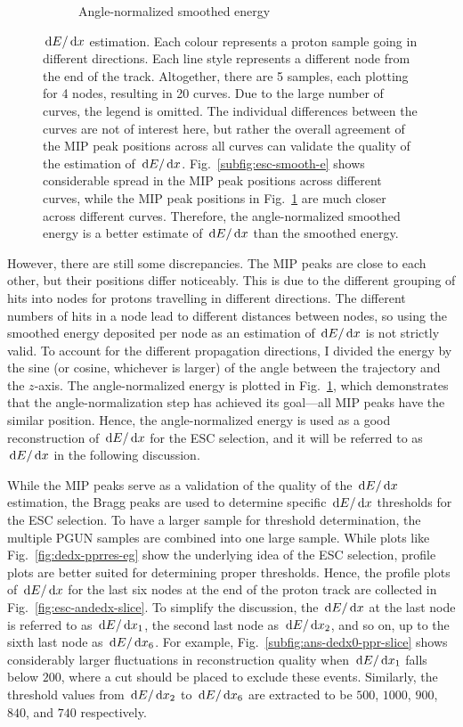 \begin{figure}[htb]
\begin{subfigure}{\dbfigwid\textwidth}
             \caption{Angle-normalized smoothed energy}
             \label{subfig:esc-an-smooth-e}
        \end{subfigure}
        \caption{$\,\textrm{d}E/\,\textrm{d}x$ estimation. Each colour represents a proton sample going in different directions. Each line style represents a different node from the end of the track. Altogether, there are 5 samples, each plotting for 4 nodes, resulting in 20 curves. Due to the large number of curves, the legend is omitted. The individual differences between the curves are not of interest here, but rather the overall agreement of the MIP peak positions across all curves can validate the quality of the estimation of $\,\textrm{d}E/\,\textrm{d}x$. Fig.~\ref{subfig:esc-smooth-e} shows considerable spread in the MIP peak positions across different curves, while the MIP peak positions in Fig.~\ref{subfig:esc-an-smooth-e} are much closer across different curves. Therefore, the angle-normalized smoothed energy is a better estimate of $\,\textrm{d}E/\,\textrm{d}x$ than the smoothed energy.}
        \label{fig:esc-angnorm}
     \end{figure}
     However, there are still some discrepancies.
     The MIP peaks are close to each other, but their positions differ noticeably.
     This is due to the different grouping of hits into nodes for protons travelling in different directions.
     The different numbers of hits in a node lead to different distances between nodes, so using the smoothed energy deposited per node as an estimation of $\,\textrm{d}E/\,\textrm{d}x$ is not strictly valid.
     To account for the different propagation directions, I divided the energy by the sine (or cosine, whichever is larger) of the angle between the trajectory and the $z$-axis.
     The angle-normalized energy is plotted in Fig.~\ref{subfig:esc-an-smooth-e}, which demonstrates that the angle-normalization step has achieved its goal—all MIP peaks have the similar position.
     Hence, the angle-normalized energy is used as a good reconstruction of $\,\textrm{d}E/\,\textrm{d}x$ for the ESC selection, and it will be referred to as $\,\textrm{d}E/\,\textrm{d}x$ in the following discussion.

     While the MIP peaks serve as a validation of the quality of the $\,\textrm{d}E/\,\textrm{d}x$ estimation, the Bragg peaks are used to determine specific $\,\textrm{d}E/\,\textrm{d}x$ thresholds for the ESC selection.
     To have a larger sample for threshold determination, the multiple PGUN samples are combined into one large sample.
     While plots like Fig.~\ref{fig:dedx-pprres-eg} show the underlying idea of the ESC selection, profile plots are better suited for determining proper thresholds.
     Hence, the profile plots of $\,\textrm{d}E/\,\textrm{d}x$ for the last six nodes at the end of the proton track are collected in Fig.~\ref{fig:esc-andedx-slice}.
     To simplify the discussion, the $\,\textrm{d}E/\,\textrm{d}x$ at the last node is referred to as $\,\textrm{d}E/\,\textrm{d}x_1$, the second last node as $\,\textrm{d}E/\,\textrm{d}x_2$, and so on, up to the sixth last node as $\,\textrm{d}E/\,\textrm{d}x_6$.
     For example, Fig.~\ref{subfig:ans-dedx0-ppr-slice} shows considerably larger fluctuations in reconstruction quality when $\,\textrm{d}E/\,\textrm{d}x_1$ falls below $200$, where a cut should be placed to exclude these events.
     Similarly, the threshold values from $\,\textrm{d}E/\,\textrm{d}x_2$ to $\,\textrm{d}E/\,\textrm{d}x_6$ are extracted to be $500$, $1000$, $900$, $840$, and $740$ respectively.

